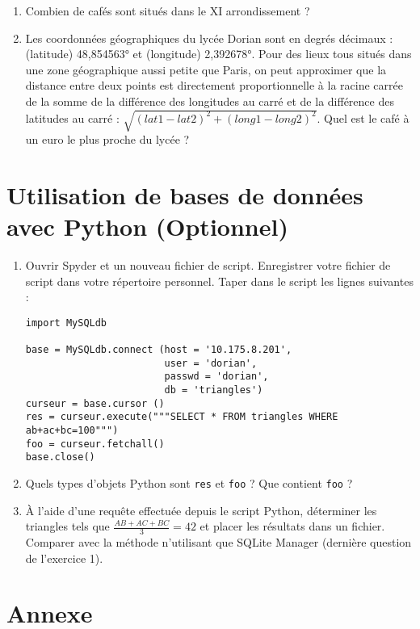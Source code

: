 \begin{enumerate}
 \item Combien de cafés sont situés dans le XI arrondissement ?
 
 \item Les coordonnées géographiques du lycée Dorian sont en degrés décimaux : (latitude) 48,854563° et (longitude) 2,392678°. Pour des lieux tous situés dans une zone géographique aussi petite que Paris, on peut approximer que la distance entre deux points est directement proportionnelle à la racine carrée de la somme de la différence des longitudes au carré et de la différence des latitudes au carré : $\sqrt{(lat1-lat2)^2  + (long1-long2)^2}$. Quel est le café à un euro le plus proche du lycée ?
\end{enumerate}

\section{Utilisation de bases de données avec Python (Optionnel)}

\begin{enumerate}
  \item Ouvrir Spyder et un nouveau fichier de script. Enregistrer votre fichier de script dans votre répertoire personnel. Taper dans le script les lignes suivantes :

  \begin{verbatim}
import MySQLdb

base = MySQLdb.connect (host = '10.175.8.201',
                        user = 'dorian',
                        passwd = 'dorian',
                        db = 'triangles')
curseur = base.cursor ()
res = curseur.execute("""SELECT * FROM triangles WHERE ab+ac+bc=100""")
foo = curseur.fetchall()
base.close()
  \end{verbatim}

  \item Quels types d'objets Python sont \verb|res| et \verb|foo| ? Que contient \verb|foo| ?

  \item À l'aide d'une requête effectuée depuis le script Python, déterminer les triangles tels que $\frac{AB+AC+BC}{3} = 42$ et placer les résultats dans un fichier. Comparer avec la méthode n'utilisant que SQLite Manager (dernière question de l'exercice 1).
\end{enumerate}

\newpage
\section{Annexe}
